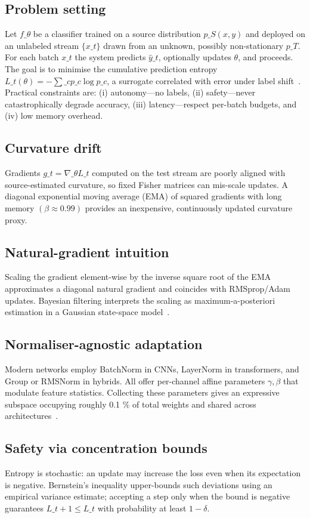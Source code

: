 \documentclass{article} %
\begin{document}
\subsection{Problem setting}
Let \(f\_\theta\) be a classifier trained on a source distribution \(p\_S(x,y)\) and deployed on an unlabeled stream \(\{x\_t\}\) drawn from an unknown, possibly non-stationary \(p\_T\). For each batch \(x\_t\) the system predicts \(\hat{y}\_t\), optionally updates \(\theta\), and proceeds. The goal is to minimise the cumulative prediction entropy \(L\_t(\theta) = -\sum\_c p\_c \log p\_c\), a surrogate correlated with error under label shift~\cite{wang-2020-tent}. Practical constraints are: (i) autonomy---no labels, (ii) safety---never catastrophically degrade accuracy, (iii) latency---respect per-batch budgets, and (iv) low memory overhead.
\subsection{Curvature drift}
Gradients \(g\_t = \nabla\_\theta L\_t\) computed on the test stream are poorly aligned with source-estimated curvature, so fixed Fisher matrices can mis-scale updates. A diagonal exponential moving average (EMA) of squared gradients with long memory \((\beta \approx 0.99)\) provides an inexpensive, continuously updated curvature proxy.
\subsection{Natural-gradient intuition}
Scaling the gradient element-wise by the inverse square root of the EMA approximates a diagonal natural gradient and coincides with RMSprop/Adam updates. Bayesian filtering interprets the scaling as maximum-a-posteriori estimation in a Gaussian state-space model~\cite{aitchison-2018-bayesian}.
\subsection{Normaliser-agnostic adaptation}
Modern networks employ BatchNorm in CNNs, LayerNorm in transformers, and Group or RMSNorm in hybrids. All offer per-channel affine parameters \(\gamma, \beta\) that modulate feature statistics. Collecting these parameters gives an expressive subspace occupying roughly 0.1 \% of total weights and shared across architectures~\cite{lim-2023-ttn}.
\subsection{Safety via concentration bounds}
Entropy is stochastic: an update may increase the loss even when its expectation is negative. Bernstein's inequality upper-bounds such deviations using an empirical variance estimate; accepting a step only when the bound is negative guarantees \(L\_{t+1} \leq L\_t\) with probability at least \(1-\delta\).
\end{document}
